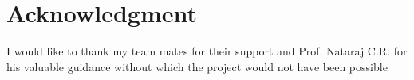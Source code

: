 \documentclass[journal]{IEEEtran}
\begin{document}
\section*{Acknowledgment}

I would like to thank my team mates for their support and Prof. Nataraj C.R. for his valuable guidance without which the project would not have been possible
\ifCLASSOPTIONcaptionsoff
  \newpage
\fi





%
%
%
\begin{thebibliography}{1}



\end{thebibliography}

% 







\end{document}
